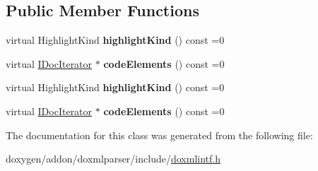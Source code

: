 \subsection*{Public Member Functions}
\begin{DoxyCompactItemize}
\item 
\mbox{\label{class_i_doc_highlight_a2e14cd6bb9b89b801af9f4a5076d5b48}} 
virtual Highlight\+Kind {\bfseries highlight\+Kind} () const =0
\item 
\mbox{\label{class_i_doc_highlight_a22fe3bbd34d22aa6019039dff7420ad5}} 
virtual \mbox{\hyperlink{class_i_doc_iterator}{I\+Doc\+Iterator}} $\ast$ {\bfseries code\+Elements} () const =0
\item 
\mbox{\label{class_i_doc_highlight_a2e14cd6bb9b89b801af9f4a5076d5b48}} 
virtual Highlight\+Kind {\bfseries highlight\+Kind} () const =0
\item 
\mbox{\label{class_i_doc_highlight_a22fe3bbd34d22aa6019039dff7420ad5}} 
virtual \mbox{\hyperlink{class_i_doc_iterator}{I\+Doc\+Iterator}} $\ast$ {\bfseries code\+Elements} () const =0
\end{DoxyCompactItemize}


The documentation for this class was generated from the following file\+:\begin{DoxyCompactItemize}
\item 
doxygen/addon/doxmlparser/include/\mbox{\hyperlink{include_2doxmlintf_8h}{doxmlintf.\+h}}\end{DoxyCompactItemize}
